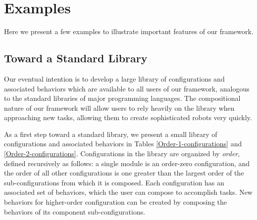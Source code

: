 \documentclass[graybox]{svmult}
\begin{document}
%
\section{Examples}
\label{sec:examples}
Here we present a few examples to illustrate important features of our framework.
\subsection{Toward a Standard Library}
Our eventual intention is to develop a large library of configurations and associated
behaviors which are available to all users of our framework, analogous to the standard
libraries of major programming languages.  The compositional nature of our framework
will allow users to rely heavily on the library when approaching new tasks, allowing
them to create sophisticated robots very quickly.

As a first step toward a standard library, we present a small library of configurations
and associated behaviors in Tables \ref{Order-1-configurations} and \ref{Order-2-configurations}.
Configurations in the library are organized by \textit{order}, defined recursively
as follows: a single module is an order-zero configuration, and the order of all
other configurations is one greater than the largest order of the sub-configurations
from which it is composed. Each configuration has an associated set of behaviors,
which the user can compose to accomplish tasks.  New behaviors for higher-order configuration can be created by composing the behaviors of its component sub-configurations.
\end{document}
